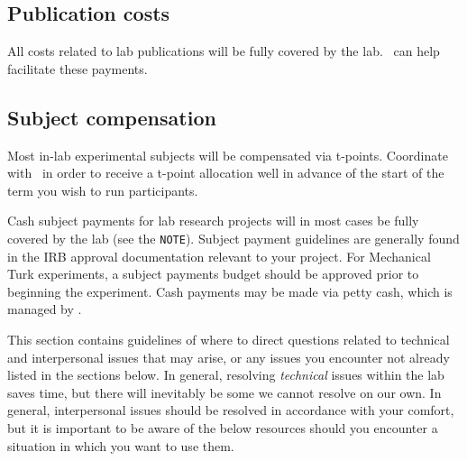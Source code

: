 \documentclass{tufte-book} %
\begin{document}
 \subsection{Publication costs}
 All costs related to lab publications will be fully covered by the
 lab.  \coordinator~can help facilitate these payments.

 \subsection{Subject compensation}
 Most in-lab experimental subjects will be compensated via t-points.
 Coordinate with \coordinator~in order to receive a t-point allocation
 well in advance of the start of the term you wish to run
 participants.

   Cash
 subject payments for lab research projects will in most cases be
 fully covered by the lab (see the \texttt{NOTE}).  Subject payment
 guidelines are generally found in the IRB approval documentation
 relevant to your project.  For Mechanical Turk experiments, a subject
 payments budget should be approved prior to beginning the experiment.
 Cash payments may be made via petty cash, which is managed by
 \coordinator.



\noindent This section contains guidelines of where to direct
questions related to technical and interpersonal issues that may
arise, or any issues you encounter not already listed in the sections
below. In general, resolving \textit{technical} issues within the lab
saves time, but there will inevitably be some we cannot resolve on our
own. In general, interpersonal issues should be resolved in accordance
with your comfort, but it is important to be aware of the below
resources should you encounter a situation in which you want to use
them.
\end{document}

